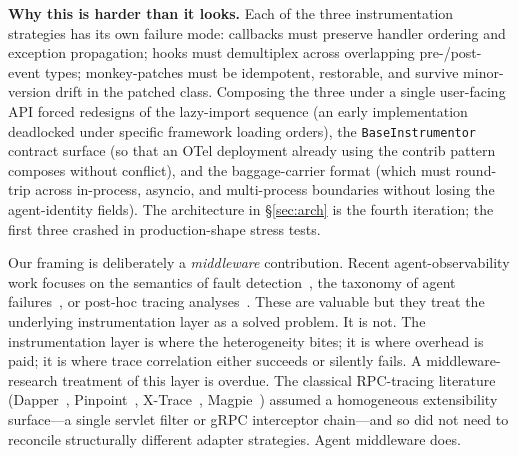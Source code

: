 \documentclass[sigconf,review,anonymous,9pt]{acmart}
\begin{document}
\textbf{Why this is harder than it looks.} Each of the three
instrumentation strategies has its own failure mode: callbacks must
preserve handler ordering and exception propagation; hooks must
demultiplex across overlapping pre-/post- event types; monkey-patches
must be idempotent, restorable, and survive minor-version drift in
the patched class. Composing the three under a single user-facing API
forced redesigns of the lazy-import sequence (an early implementation
deadlocked under specific framework loading orders), the
\texttt{BaseInstrumentor} contract surface (so that an OTel deployment
already using the contrib pattern composes without conflict), and the
baggage-carrier format (which must round-trip across in-process,
asyncio, and multi-process boundaries without losing the
agent-identity fields). The architecture in \S\ref{sec:arch} is the
fourth iteration; the first three crashed in production-shape stress
tests.

Our framing is deliberately a \emph{middleware} contribution. Recent
agent-observability work focuses on the semantics of fault
detection~\cite{aegis,agentdebug,agentrx}, the taxonomy of agent
failures~\cite{mast}, or post-hoc tracing
analyses~\cite{agdebugger,agentops}. These are valuable but they
treat the underlying instrumentation layer as a solved problem. It is
not. The instrumentation layer is where the heterogeneity bites; it
is where overhead is paid; it is where trace correlation either
succeeds or silently fails. A middleware-research treatment of this
layer is overdue. The classical RPC-tracing literature
(Dapper~\cite{dapper}, Pinpoint~\cite{pinpoint},
X-Trace~\cite{xtrace}, Magpie~\cite{magpie}) assumed a homogeneous
extensibility surface---a single servlet filter or gRPC interceptor
chain---and so did not need to reconcile structurally different
adapter strategies. Agent middleware does.
\end{document}
